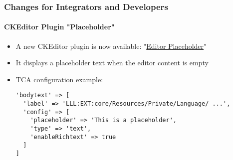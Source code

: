 %

\begin{frame}[fragile]
	\frametitle{Changes for Integrators and Developers}
	\framesubtitle{CKEditor Plugin "Placeholder"}

	\lstset{basicstyle=\tiny\ttfamily}

	\begin{itemize}
		\item A new CKEditor plugin is now available:
			"\href{https://ckeditor.com/docs/ckeditor4/latest/examples/editorplaceholder.html}{Editor Placeholder}"
		\item It displays a placeholder text when the editor content is empty
		\item TCA configuration example:
\begin{lstlisting}
'bodytext' => [
  'label' => 'LLL:EXT:core/Resources/Private/Language/ ...',
  'config' => [
    'placeholder' => 'This is a placeholder',
    'type' => 'text',
    'enableRichtext' => true
  ]
]
\end{lstlisting}

	\end{itemize}

\end{frame}

